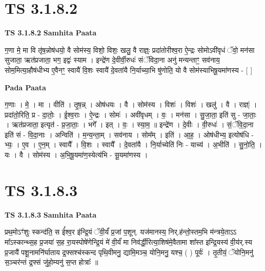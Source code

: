 \documentclass[17pt]{extarticle}
\begin{document}
\section*{ TS 3.1.8.2 }

\textbf{TS 3.1.8.2 } \newline
\textbf{Samhita Paata} \newline

ग॒णा मे॒ मा वि तृ॑ष॒न्नोष॑धयो॒ वै सोम॑स्य॒ विशो॒ विशः॒ खलु॒ वै राज्ञ्ः॒ प्रदा॑तोरीश्व॒रा ऐ॒न्द्रः सोमोऽवी॑वृधं ॅवो॒ मन॑सा सुजाता॒ ऋत॑प्रजाता॒ भग॒ इद्वः॑ स्याम । इन्द्रे॑ण दे॒वीर्वी॒रुधः॑ संॅविदा॒ना अनु॑ मन्यन्ताꣳ॒॒ सव॑नाय॒ सोम॒मित्या॒हौष॑धीभ्य ए॒वैनꣳ॒॒ स्वायै॑ वि॒शः स्वायै॑ दे॒वता॑यै नि॒र्याच्या॒भि षु॑णोति॒ यो वै सोम॑स्याभिषू॒यमा॑णस्य - [  ] \newline

\textbf{Pada Paata} \newline

ग॒णाः । मे॒ । मा । वीति॑ । तृ॒ष॒न्न् । ओष॑धयः । वै । सोम॑स्य । विशः॑ । विशः॑ । खलु॑ । वै । राज्ञ्ः॑ । प्रदा॑तो॒रिति॒ प्र - दा॒तोः॒ । ई॒श्व॒राः । ऐ॒न्द्रः । सोमः॑ । अवी॑वृधम् । वः॒ । मन॑सा । सु॒जा॒ता॒ इति॑ सु - जा॒ताः॒ । ऋत॑प्रजाता॒ इत्यृत॑ - प्र॒जा॒ताः॒ । भगे᳚ । इत् । वः॒ । स्या॒म॒ ॥ इन्द्रे॑ण । दे॒वीः । वी॒रुधः॑ । सं॒ॅवि॒दा॒ना इति॑ सं - वि॒दा॒नाः । अन्विति॑ । म॒न्य॒न्ता॒म् । सव॑नाय । सोम᳚म् । इति॑ । आ॒ह॒ । ओष॑धीभ्य॒ इत्योष॑धि - भ्यः॒ । ए॒व । ए॒न॒म् । स्वायै᳚ । वि॒शः । स्वायै᳚ । दे॒वता॑यै । नि॒र्याच्येति॑ निः - याच्य॑ । अ॒भीति॑ । सु॒नो॒ति॒ । यः । वै । सोम॑स्य । अ॒भि॒षू॒यमा॑ण॒स्येत्य॑भि - सू॒यमा॑णस्य ।  \newline




\section*{ TS 3.1.8.3 }

\textbf{TS 3.1.8.3 } \newline
\textbf{Samhita Paata} \newline

प्रथ॒मोऽꣳ॑शुः स्कन्द॑ति॒ स ई᳚श्व॒र इ॑न्द्रि॒यं ॅवी॒र्यं॑ प्र॒जां प॒शून्. यज॑मानस्य॒ निर्.ह॑न्तो॒स्तम॒भि म॑न्त्रये॒ताऽऽ मा᳚ऽस्कान्थ्स॒ह प्र॒जया॑ स॒ह रा॒यस्पोषे॑णेन्द्रि॒यं मे॑ वी॒र्यं॑ मा निव॑र्द्धी॒रित्या॒शिष॑मे॒वैतामा शा᳚स्त इन्द्रि॒यस्य॑ वी॒य॑र्.स्य प्र॒जायै॑ पशू॒नामनि॑र्घाताय द्र॒फ्सश्च॑स्कन्द पृथि॒वीमनु॒ द्यामि॒मञ्च॒ योनि॒मनु॒ यश्च॒ ( ) पूर्वः॑ । तृ॒तीयं॒ ॅयोनि॒मनु॑ स॒ञ्चर॑न्तं द्र॒फ्सं जु॑हो॒म्यनु॑ स॒प्त होत्राः᳚ ॥ \newline
\end{document}
